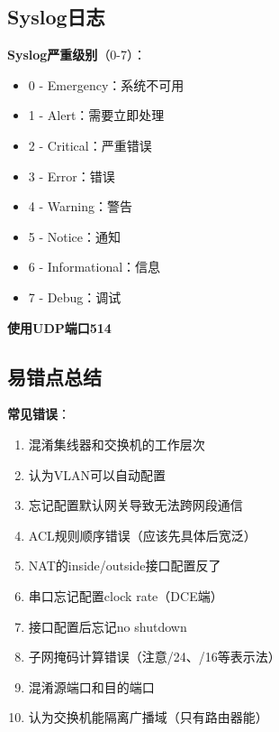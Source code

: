 \documentclass[12pt,a4paper]{ctexart}
\begin{document}
\subsection{Syslog日志}

\begin{keybox}
\textbf{Syslog严重级别}（0-7）：

\begin{itemize}[itemsep=0pt]
    \item 0 - Emergency：系统不可用
    \item 1 - Alert：需要立即处理
    \item 2 - Critical：严重错误
    \item 3 - Error：错误
    \item 4 - Warning：警告
    \item 5 - Notice：通知
    \item 6 - Informational：信息
    \item 7 - Debug：调试
\end{itemize}

\textbf{使用UDP端口514}
\end{keybox}

\subsection{易错点总结}

\begin{keybox}
\textbf{常见错误}：

\begin{enumerate}[itemsep=0pt]
    \item 混淆集线器和交换机的工作层次
    \item 认为VLAN可以自动配置
    \item 忘记配置默认网关导致无法跨网段通信
    \item ACL规则顺序错误（应该先具体后宽泛）
    \item NAT的inside/outside接口配置反了
    \item 串口忘记配置clock rate（DCE端）
    \item 接口配置后忘记no shutdown
    \item 子网掩码计算错误（注意/24、/16等表示法）
    \item 混淆源端口和目的端口
    \item 认为交换机能隔离广播域（只有路由器能）
\end{enumerate}
\end{keybox}

\end{document}
